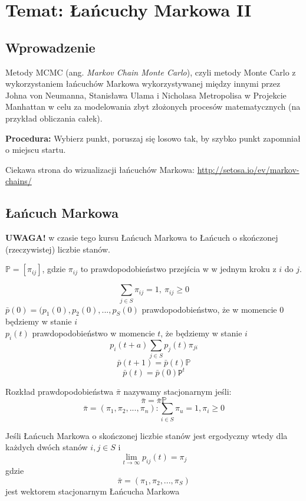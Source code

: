 \section[Wykład 8: 27-IV-2017 - Temat: Łańcuchy Markowa II]{Temat: Łańcuchy Markowa II}
\subsection{Wprowadzenie}
Metody MCMC (ang. \textit{Markov Chain Monte Carlo}), czyli metody Monte Carlo z wykorzystaniem łańcuchów Markowa wykorzystywanej między innymi przez Johna von Neumanna, Stanisława Ulama i Nicholasa Metropolisa w Projekcie Manhattan w celu za modelowania zbyt złożonych procesów matematycznych (na przykład obliczania całek).

\textbf{Procedura:} Wybierz punkt, {\color{green} poruszaj się losowo} tak, by {\color{red}szybko} punkt {\color{blue}zapomniał} o miejscu startu.


Ciekawa strona do wizualizacji łańcuchów Markowa: \url{http://setosa.io/ev/markov-chains/}
\subsection{Łańcuch Markowa}
\textbf{UWAGA!} w czasie tego kursu Łańcuch Markowa to Łańcuch o skończonej (rzeczywistej) liczbie stanów.

$\mathbb{P}=[\pi _{ij}]$, gdzie $\pi _{ij}$ to prawdopodobieństwo przejścia w w jednym kroku z $i$ do $j$.

$$\sum _{j\in S}\pi _{ij}=1,\ \pi _{ij}\geq 0$$
$\bar{p}(0)=(p_1(0),p_2(0),...,p_S(0)$ prawdopodobieństwo, że w momencie $0$ będziemy w stanie $i$\\
$p_i(t)$ prawdopodobieństwo w momencie $t$, że będziemy w stanie $i$\\
$$p_i(t+a)\sum _{j\in S}p_j(t)\pi _{ji}$$
$$\bar{p}(t+1)=\bar{p}(t)\mathbb{P}$$
$$\bar{p}(t)=\bar{p}(0)\mathtt{P}^t$$

\begin{definition}\label{def:RozkladStacjonarny}
Rozkład prawdopodobieństwa $\bar{\pi}$ nazywamy stacjonarnym jeśli: $$\bar{\pi}=\bar{\pi}\mathbb{P}$$ 
$$\bar{\pi}=(\pi _1,\pi _2,..., \pi _n) : \sum _{i\in S}\pi _u =1, \pi _i \geq 0$$
\end{definition}

\begin{theorem}
Jeśli Łańcuch Markowa o skończonej liczbie stanów jest ergodyczny wtedy dla każdych dwóch stanów $i,j\in S$ i $$\lim _{t\rightarrow \infty }p_{ij}(t)=\pi _j$$ gdzie $$\bar{\pi}=(\pi _1,\pi _2,...,\pi _S)$$ jest wektorem stacjonarnym Łańcucha Markowa
\end{theorem}

